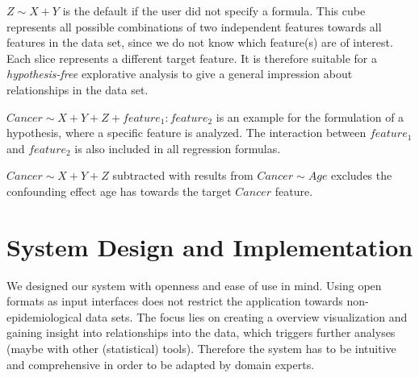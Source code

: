 \documentclass[journal]{style/vgtc} 			          %
\begin{document}
$Z \sim X + Y$ is the default if the user did not specify a formula.
This cube represents all possible combinations of two independent features towards all features in the data set, since we do not know which feature(s) are of interest.
Each slice represents a different target feature.
It is therefore suitable for a \emph{hypothesis-free} explorative analysis to give a general impression about relationships in the data set.

$Cancer \sim X + Y + Z + feature_1:feature_2$ is an example for the formulation of a hypothesis, where a specific feature is analyzed.
The interaction between $feature_1$ and $feature_2$ is also included in all regression formulas.

$Cancer \sim X + Y + Z$ subtracted with results from $Cancer \sim Age$ excludes the confounding effect age has towards the target $Cancer$ feature.

\section{System Design and Implementation} \label{sec:SystemDesign}
We designed our system with openness and ease of use in mind.
Using open formats as input interfaces does not restrict the application towards non-epidemiological data sets.
The focus lies on creating a overview visualization and gaining insight into relationships into the data, which triggers further analyses (maybe with other (statistical) tools).
Therefore the system has to be intuitive and comprehensive in order to be adapted by domain experts.
\end{document}
